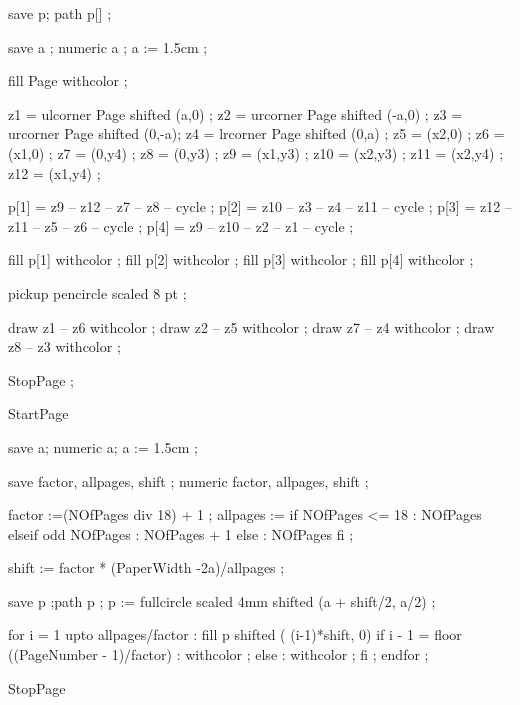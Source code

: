 save p; path p[] ;

save a ; numeric a ;
a := 1.5cm ;

fill Page withcolor  ;

z1 = ulcorner Page shifted (a,0) ; z2 = urcorner Page shifted (-a,0) ;
z3 = urcorner Page shifted (0,-a); z4 = lrcorner Page shifted (0,a)  ;
z5 = (x2,0) ;   z6 = (x1,0) ;
z7 = (0,y4) ;   z8 = (0,y3) ;
z9 = (x1,y3) ;  z10 = (x2,y3) ;
z11 = (x2,y4) ; z12 = (x1,y4) ;

p[1] = z9  -- z12 -- z7 -- z8  -- cycle ;
p[2] = z10 -- z3  -- z4 -- z11 -- cycle ;
p[3] = z12 -- z11 -- z5 -- z6  -- cycle ;
p[4] = z9  -- z10 -- z2 -- z1  -- cycle ;

fill p[1] withcolor  ;
fill p[2] withcolor  ;
fill p[3] withcolor  ;
fill p[4] withcolor  ;

pickup pencircle scaled 8 pt ;

draw z1 -- z6 withcolor  ;
draw z2 -- z5 withcolor  ;
draw z7 -- z4 withcolor  ;
draw z8 -- z3 withcolor  ;

StopPage ;
\stopuniqueMPgraphic 

StartPage

save a; numeric a;
a := 1.5cm ;   

save factor, allpages, shift ;
numeric factor, allpages, shift ;

factor :=(NOfPages div 18) + 1 ;
allpages := if NOfPages <= 18 : NOfPages elseif odd NOfPages : NOfPages + 1
            else : NOfPages fi ;

shift := factor * (PaperWidth -2a)/allpages ;

save p ;path p ;
p := fullcircle scaled 4mm shifted (a + shift/2, a/2) ;

for i = 1 upto allpages/factor :
  fill p shifted ( (i-1)*shift, 0) 
    if i - 1 = floor ((PageNumber - 1)/factor) :
      withcolor  ;
    else :
      withcolor  ;
    fi ;
endfor ;


StopPage
\stopuseMPgraphic


